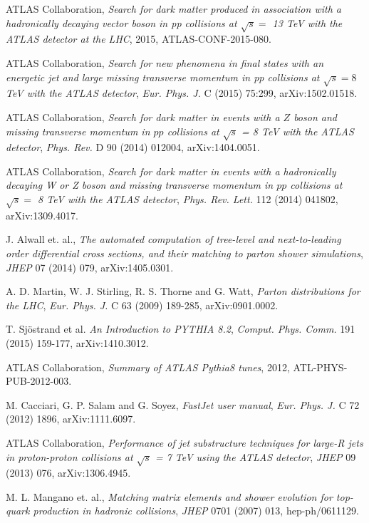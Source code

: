  ATLAS Collaboration, \emph{Search for dark matter produced in association with a hadronically decaying vector boson in pp collisions at $\sqrt{s}=$ 13 TeV with the ATLAS detector at the LHC}, 2015, ATLAS-CONF-2015-080.

 ATLAS Collaboration, \emph{Search for new phenomena in final states with an energetic jet and large missing transverse momentum in pp collisions at $\sqrt{s}=8$ TeV with the ATLAS detector}, \emph{Eur. Phys. J.} C (2015) 75:299, arXiv:1502.01518.

 ATLAS Collaboration, \emph{Search for dark matter in events with a $Z$ boson and missing transverse momentum in $pp$ collisions at $\sqrt{s}$ = 8 TeV with the ATLAS detector}, \emph{Phys. Rev.} D 90 (2014) 012004, arXiv:1404.0051.

 ATLAS Collaboration, \emph{Search for dark matter in events with a hadronically decaying W or Z boson and missing transverse momentum in $pp$ collisions at $\sqrt{s} =$ 8 TeV with the ATLAS detector}, \emph{Phys. Rev. Lett.} 112 (2014) 041802, arXiv:1309.4017.

 J. Alwall et. al., \emph{The automated computation of tree-level and next-to-leading order differential cross sections, and their matching to parton shower simulations}, \emph{JHEP} 07 (2014) 079, arXiv:1405.0301.

 A. D. Martin, W. J. Stirling, R. S. Thorne and G. Watt, \emph{Parton distributions for the LHC}, \emph{Eur. Phys. J.} C 63 (2009) 189-285, arXiv:0901.0002.

 T. Sj\"{o}strand et al. \emph{An Introduction to PYTHIA 8.2}, \emph{Comput. Phys. Comm.} 191 (2015) 159-177, arXiv:1410.3012.

 ATLAS Collaboration, \emph{Summary of ATLAS Pythia8 tunes}, 2012, ATL-PHYS-PUB-2012-003.

 M. Cacciari, G. P. Salam and G. Soyez, \emph{FastJet user manual}, \emph{Eur. Phys. J.} C 72 (2012) 1896, arXiv:1111.6097.

 ATLAS Collaboration, \emph{Performance of jet substructure techniques for large-R jets in proton-proton collisions at $\sqrt{s}$ = 7 TeV using the ATLAS detector}, \emph{JHEP} 09 (2013) 076, arXiv:1306.4945.

 M. L. Mangano et. al., \emph{Matching matrix elements and shower evolution for top-quark production in hadronic collisions}, \emph{JHEP} 0701 (2007) 013, hep-ph/0611129.

